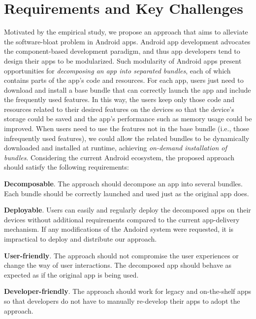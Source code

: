 \section{Requirements and Key Challenges}
Motivated by the empirical study, we propose an approach that aims to alleviate the software-bloat problem in Android apps.
Android app development advocates the component-based development paradigm, and thus app developers tend to design their apps to be modularized.
Such modularity of Android apps present opportunities for \emph{decomposing an app into separated bundles}, each of which contains parts of the app's code and resources.
For each app, users just need to download and install a base bundle that can correctly launch the app and include the frequently used features.
In this way, the users keep only those code and resources related to their desired features on the devices so that the device's storage could be saved and the app's performance such as memory usage could be improved.
When users need to use the features not in the base bundle (i.e., those infrequently used features), we could allow the related bundles to be dynamically downloaded and installed at runtime,
achieving \emph{on-demand installation of bundles}.
Considering the current Android ecosystem, the proposed approach should satisfy the following requirements:

\noindent\textbf{Decomposable}. The approach should decompose an app into several bundles. Each bundle should be correctly launched and used just as the original app does.

\noindent\textbf{Deployable}. Users can easily and regularly deploy the decomposed apps on their devices without additional requirements compared to the current app-delivery mechanism. If any modifications of the Andoird system were requested, it is impractical to deploy and distribute our approach.

\noindent\textbf{User-friendly}. The approach should not compromise the user experiences or change the way of user interactions. The decomposed app should behave as expected as if the original app is being used.

\noindent\textbf{Developer-friendly}. The approach should work for legacy and on-the-shelf apps so that developers do not have to manually re-develop their apps to adopt the approach.



